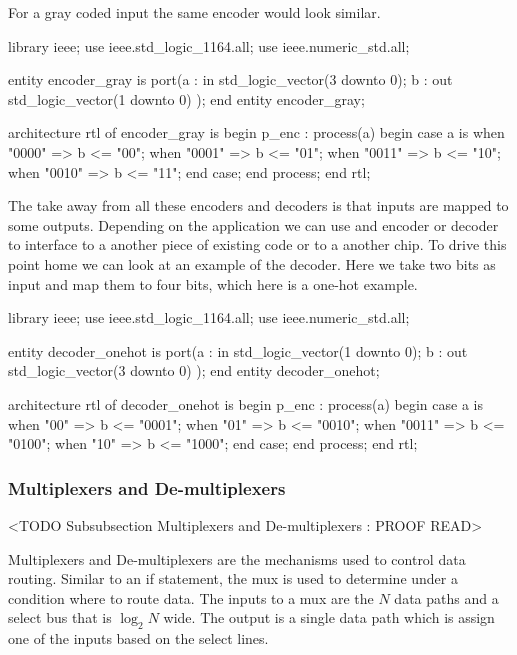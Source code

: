 For a gray coded input the same encoder would look similar.

\begin{VHDLlisting}[tabsize=4]
library ieee;
  use ieee.std_logic_1164.all;
  use ieee.numeric_std.all;
  
entity encoder_gray is
port(a : in    std_logic_vector(3 downto 0);
     b :   out std_logic_vector(1 downto 0)
);
end entity encoder_gray;

architecture rtl of encoder_gray is
begin
	p_enc : process(a)
	begin
		case a is	
			when "0000" => 
				b <= "00";
			when "0001" => 
				b <= "01";
			when "0011" => 
				b <= "10";
			when "0010" => 
				b <= "11";
		end case;
	end process;
end rtl;
\end{VHDLlisting}
	
The take away from all these encoders and decoders is that inputs are mapped to some outputs. Depending on the application we can use and encoder or decoder to interface to a another piece of existing code or to a another chip. To drive this point home we can look at an example of the decoder. Here we take two bits as input and map them to four bits, which here is a one-hot example.

\begin{VHDLlisting}[tabsize=4]
library ieee;
  use ieee.std_logic_1164.all;
  use ieee.numeric_std.all;
  
entity decoder_onehot is
port(a : in    std_logic_vector(1 downto 0);
     b :   out std_logic_vector(3 downto 0)
);
end entity decoder_onehot;

architecture rtl of decoder_onehot is
begin
	p_enc : process(a)
	begin
		case a is	
			when "00" => 
				b <= "0001";
			when "01" => 
				b <= "0010";
			when "0011" => 
				b <= "0100";
			when "10" => 
				b <= "1000";
		end case;
	end process;
end rtl;
\end{VHDLlisting}

\subsubsection{Multiplexers and De-multiplexers}
	<TODO Subsubsection  Multiplexers and De-multiplexers : PROOF READ>
	
Multiplexers and De-multiplexers are the mechanisms used to control data routing. Similar to an \ac{if} statement, the \ac{mux} is used to determine under a condition where to route data. The inputs to a \ac{mux} are the $N$ data paths and a select bus that is $\log_{2}N$ wide. The output is a single data path which is assign one of the inputs based on the select lines. 

